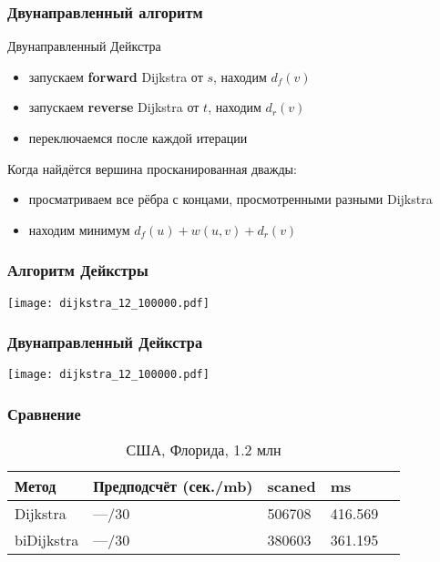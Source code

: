 \documentclass{beamer}
\begin{document}

\begin{frame}
\frametitle{Двунаправленный алгоритм}
\begin{block}{Двунаправленный Дейкстра}
  \begin{itemize}	
  \item запускаем \textbf{forward} Dijkstra от $s$, находим $d_f(v)$ 
  \item запускаем \textbf{reverse} Dijkstra от $t$, находим $d_r(v)$
  \item переключаемся после каждой итерации
  \end{itemize}
\end{block}

\begin{block}{Когда найдётся вершина просканированная дважды:}
  \begin{itemize}	
  \item просматриваем все рёбра с концами, просмотренными разными Dijkstra
  \item находим минимум $d_f(u) + w(u, v) + d_r(v)$
  \end{itemize}
\end{block}
\end{frame}


\begin{frame}
\frametitle{Алгоритм Дейкстры}
\texttt{[image: dijkstra\_12\_100000.pdf]}
\end{frame}


\begin{frame}
\frametitle{Двунаправленный Дейкстра}
\texttt{[image: dijkstra\_12\_100000.pdf]}
\end{frame}


\begin{frame}
\frametitle{Сравнение}
\begin{table}
\begin{tabular}{l l l l l}
\toprule
\textbf{Метод} & \textbf{Предподсчёт (сек./mb)} & \textbf{scaned} 
& \textbf{ms}\\
\midrule
Dijkstra    & ---/30 & 506708 & 416.569\\
biDijkstra  & ---/30 & 380603 & 361.195\\
\bottomrule
\end{tabular}
\caption{США, Флорида, 1.2 млн}
\end{table}
\end{frame}
\end{document}
